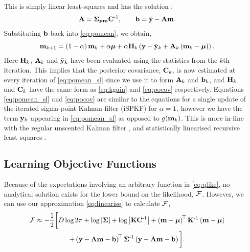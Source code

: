\documentclass{article} %
\begin{document}
This is simply linear least-squares and has the solution \cite{Geist2010}:
\begin{equation}
    \mathbf{A} = \boldsymbol\Sigma_{\mathbf{y}\mathbf{m}} \mathbf{C}^{\text{-}1}, \qquad
    \mathbf{b} = \bar{\mathbf{y}} - \mathbf{A}\mathbf{m}.
\end{equation}
Substituting $\mathbf{b}$ back into \eqref{eq:pomean}, we obtain, 
\begin{equation}
    \mathbf{m}_{k+1} = \left({1-\alpha}\right)\mathbf{m}_k + \alpha\boldsymbol{\mu} 
        + \alpha\mathbf{H}_k\left({\mathbf{y} - \bar{\mathbf{y}}_k 
        + \mathbf{A}_k\left({\mathbf{m}_k - \boldsymbol{\mu}}\right)}\right).
    \label{eq:pomean_sl}
\end{equation}
Here $\mathbf{H}_k$, $\mathbf{A}_k$ and $\bar{\mathbf{y}}_k$ have been evaluated using the
statistics from the $k$th iteration. This implies that the posterior
covariance, $\mathbf{C}_k$, is now estimated at every iteration of
\eqref{eq:pomean_sl} since we use it to form $\mathbf{A}_k$ and $\mathbf{b}_k$, and 
$\mathbf{H}_k$ and $\mathbf{C}_k$ have the same form as \eqref{eq:kgain} and
\eqref{eq:pocov} respectively. Equations \eqref{eq:pomean_sl} and
\eqref{eq:pocov} are similar to the equations for a single update of the
iterated sigma-point Kalman filter (iSPKF) \cite{Sibley2006} for $\alpha = 1$,
however we have the term $\bar{\mathbf{y}}_k$ appearing in \eqref{eq:pomean_sl} as
opposed to $g\!\left({{\mathbf{m}_k}}\right)$. This is more in-line with the regular
unscented Kalman filter \cite{Julier2004}, and statistically linearised
recursive least squares \cite{Geist2010}.


\subsection{Learning Objective Functions}

Because of the expectations involving an arbitrary function in
\eqref{eq:qlike}, no analytical solution exists for the lower bound on the
likelihood, $\mathcal{F}$. However, we can use our approximation
\eqref{eq:linearise} to calculate $\mathcal{F}$,
\begin{multline}
    \mathcal{F} \approx - \frac{1}{2} \bigg[
        D\log{2\pi} + \log\left|{\boldsymbol{\Sigma}}\right| + \log\left|{\mathbf{K}\mathbf{C}^{\text{-}1}}\right|
    + \left({\mathbf{m} - \boldsymbol{\mu}}\right)^{\!\top}\mathbf{K}^{\text{-}1}
        \left({\mathbf{m} - \boldsymbol{\mu}}\right) \\
    + \left({\mathbf{y} - \mathbf{A}\mathbf{m} - \mathbf{b}}\right)^{\!\top}\boldsymbol{\Sigma}^{\text{-}1}
        \left({\mathbf{y} - \mathbf{A}\mathbf{m} - \mathbf{b}}\right)
        \bigg].
    \label{eq:approxfengy}
\end{multline}
\end{document}
